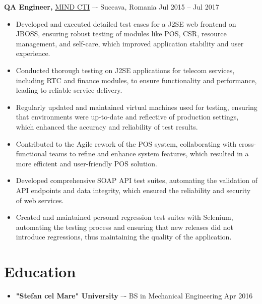 \documentclass[11pt]{article}       %
\begin{document}
\textbf{QA Engineer,} \href{https://mindcti.com/}{MIND CTI} –- Suceava, Romania \hfill Jul 2015 – Jul 2017
\vspace{-9pt}

\begin{itemize}
    \item Developed and executed detailed test cases for a J2SE web frontend on JBOSS, ensuring robust testing of modules like POS, CSR, resource management, and self-care, which improved application stability and user experience.
    \item Conducted thorough testing on J2SE applications for telecom services, including RTC and finance modules, to ensure functionality and performance, leading to reliable service delivery.
    \item Regularly updated and maintained virtual machines used for testing, ensuring that environments were up-to-date and reflective of production settings, which enhanced the accuracy and reliability of test results.
    \item Contributed to the Agile rework of the POS system, collaborating with cross-functional teams to refine and enhance system features, which resulted in a more efficient and user-friendly POS solution.
    \item Developed comprehensive SOAP API test suites, automating the validation of API endpoints and data integrity, which ensured the reliability and security of web services.
    \item Created and maintained personal regression test suites with Selenium, automating the testing process and ensuring that new releases did not introduce regressions, thus maintaining the quality of the application.
\end{itemize}
\vspace{-18.5pt}

\section*{Education}
\begin{itemize}
    \item \textbf{"Stefan cel Mare" University} –- BS in Mechanical Engineering \hfill Apr 2016
\end{itemize}
\end{document}
